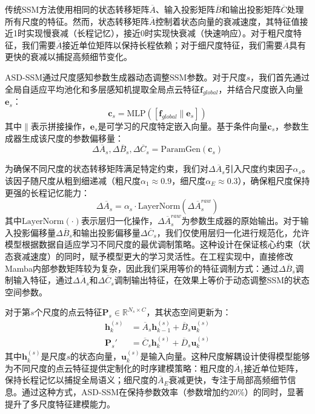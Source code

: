 \documentclass[preprint,12pt]{elsarticle}
\begin{document}
传统SSM方法使用相同的状态转移矩阵$\overline{A}$、输入投影矩阵$\overline{B}$和输出投影矩阵$\overline{C}$处理所有尺度的特征。然而，状态转移矩阵$\overline{A}$控制着状态向量的衰减速度，其特征值接近1时实现慢衰减（长程记忆），接近0时实现快衰减（快速响应）。对于粗尺度特征，我们需要$\overline{A}$接近单位矩阵以保持长程依赖；对于细尺度特征，我们需要$\overline{A}$具有更快的衰减以捕捉高频细节变化。

ASD-SSM通过尺度感知参数生成器动态调整SSM参数。对于尺度$s$，我们首先通过全局自适应平均池化和多层感知机提取全局点云特征$\mathbf{f}_{global}$，并结合尺度嵌入向量$\mathbf{e}_s$：
\begin{equation}
\mathbf{c}_s = \text{MLP}([\mathbf{f}_{global} \| \mathbf{e}_s])
\end{equation}
其中$\|$表示拼接操作，$\mathbf{e}_s$是可学习的尺度特定嵌入向量。基于条件向量$\mathbf{c}_s$，参数生成器生成该尺度的参数偏移量：
\begin{equation}
\Delta\overline{A}_s, \Delta\overline{B}_s, \Delta\overline{C}_s = \text{ParamGen}(\mathbf{c}_s)
\end{equation}

为确保不同尺度的状态转移矩阵满足特定约束，我们对$\Delta\overline{A}_s$引入尺度约束因子$\alpha_s$。该因子随尺度从粗到细递减（粗尺度$\alpha_1 \approx 0.9$，细尺度$\alpha_E \approx 0.3$），确保粗尺度保持更强的长程记忆能力：
\begin{equation}
\Delta\overline{A}_s = \alpha_s \cdot \text{LayerNorm}(\Delta\overline{A}_s^{raw})
\end{equation}
其中$\text{LayerNorm}(\cdot)$表示层归一化操作，$\Delta\overline{A}_s^{raw}$为参数生成器的原始输出。对于输入投影偏移量$\Delta\overline{B}_s$和输出投影偏移量$\Delta\overline{C}_s$，我们仅使用层归一化进行规范化，允许模型根据数据自适应学习不同尺度的最优调制策略。这种设计在保证核心约束（状态衰减速度）的同时，赋予模型更大的学习灵活性。在工程实现中，直接修改Mamba内部参数矩阵较为复杂，因此我们采用等价的特征调制方式：通过$\Delta\overline{B}_s$调制输入特征，通过$\Delta\overline{A}_s$和$\Delta\overline{C}_s$调制输出特征，在效果上等价于动态调整SSM的状态空间参数。

对于第$s$个尺度的点云特征$\mathbf{P}_s \in \mathbb{R}^{N_s \times C}$，其状态空间更新为：
\begin{equation}
\begin{aligned}
\mathbf{h}_k^{(s)} &= \overline{A}_s \mathbf{h}_{k-1}^{(s)} + \overline{B}_s \mathbf{u}_k^{(s)} \\
\mathbf{P}_s' &= \overline{C}_s \mathbf{h}_k^{(s)} + \overline{D}_s \mathbf{u}_k^{(s)}
\end{aligned}
\end{equation}
其中$\mathbf{h}_k^{(s)}$是尺度$s$的状态向量，$\mathbf{u}_k^{(s)}$是输入向量。这种尺度解耦设计使得模型能够为不同尺度的点云特征提供定制化的时序建模策略：粗尺度的$\overline{A}_1$接近单位矩阵，保持长程记忆以捕捉全局语义；细尺度的$\overline{A}_E$衰减更快，专注于局部高频细节信息。通过这种方式，ASD-SSM在保持参数效率（参数增加约20\%）的同时，显著提升了多尺度特征建模能力。
\end{document}
